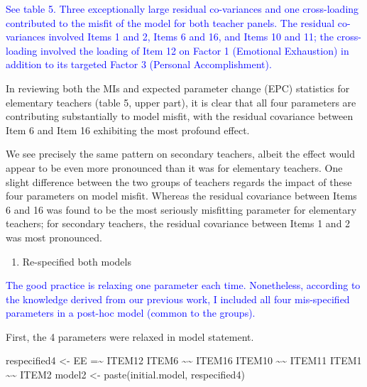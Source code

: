 \documentclass[
]{article}
\newenvironment{Shaded}{\begin{snugshade}}{\end{snugshade}}
\newcommand{\FunctionTok}[1]{\textcolor[rgb]{0.00,0.00,0.00}{#1}}
\newcommand{\NormalTok}[1]{#1}
\newcommand{\OtherTok}[1]{\textcolor[rgb]{0.56,0.35,0.01}{#1}}
\newcommand{\StringTok}[1]{\textcolor[rgb]{0.31,0.60,0.02}{#1}}
\providecommand{\tightlist}{%
  \setlength{\itemsep}{0pt}\setlength{\parskip}{0pt}}
\begin{document}
\textcolor{blue}{See table 5. Three exceptionally large residual co-variances and one cross-loading contributed to the misfit of the model for both teacher panels. The residual co-variances involved Items 1 and 2, Items 6 and 16, and Items 10 and 11; the cross-loading involved the loading of Item 12 on Factor 1 (Emotional Exhaustion) in addition to its targeted Factor 3 (Personal Accomplishment).}

In reviewing both the MIs and expected parameter change (EPC) statistics for elementary teachers (table 5, upper part), it is clear that all four parameters are contributing substantially to model misfit, with the residual covariance between Item 6 and Item 16 exhibiting the most profound effect.

We see precisely the same pattern on secondary teachers, albeit the effect would appear to be even more pronounced than it was for elementary teachers. One slight difference between the two groups of teachers regards the impact of these four parameters on model misfit. Whereas the residual covariance between Items 6 and 16 was found to be the most seriously misfitting parameter for elementary teachers; for secondary teachers, the residual covariance between Items 1 and 2 was most pronounced.

\begin{enumerate}
\def\labelenumi{(\arabic{enumi})}
\setcounter{enumi}{1}
\tightlist
\item
  Re-specified both models
\end{enumerate}

\textcolor{blue}{The good practice is relaxing one parameter each time. Nonetheless, according to the knowledge derived from our previous work, I included all four mis-specified parameters in a post-hoc model (common to the groups).}

First, the 4 parameters were relaxed in model statement.

\begin{Shaded}
\begin{Highlighting}[]
\NormalTok{respecified4 }\OtherTok{\textless{}{-}} \StringTok{\textquotesingle{}EE =\textasciitilde{} ITEM12}
\StringTok{                 ITEM6 \textasciitilde{}\textasciitilde{} ITEM16}
\StringTok{                 ITEM10 \textasciitilde{}\textasciitilde{} ITEM11}
\StringTok{                 ITEM1 \textasciitilde{}\textasciitilde{} ITEM2}
\StringTok{                 \textquotesingle{}}
\NormalTok{model2 }\OtherTok{\textless{}{-}} \FunctionTok{paste}\NormalTok{(initial.model, respecified4)}
\end{Highlighting}
\end{Shaded}
\end{document}
